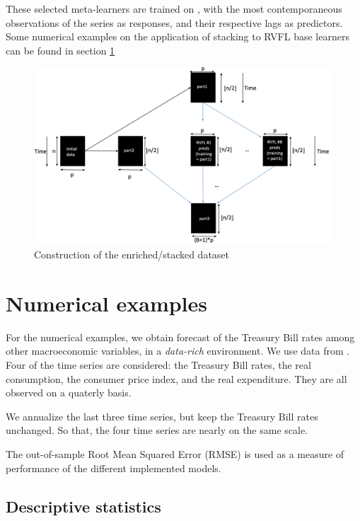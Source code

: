 These selected meta-learners are trained on , with the most contemporaneous observations of the series as responses, and their respective lags as predictors. Some numerical examples on the application of stacking to RVFL base learners can be found in section \ref{sec:numericalexamples}

\begin{figure}[!htb]
\centering
\includegraphics[width=13cm]{gfx/chapter-rvfl-ensembles/rvfl_stacking.png}
\caption{Construction of the enriched/stacked dataset}
\label{rvfl_stacking_plot}
\end{figure}


\section{Numerical examples}
\label{sec:numericalexamples}

For the numerical examples, we obtain forecast of the Treasury Bill rates among other macroeconomic variables, in a \textit{data-rich} environment. We use data from \cite{greene2000econometric}. Four of the time series are considered: the Treasury Bill rates, the real consumption, the consumer price index, and the real expenditure. They are all observed on a quaterly basis.

We annualize the last three time series, but keep the Treasury Bill rates unchanged. So that, the four time series are nearly on the same scale.

The out-of-sample Root Mean Squared Error (RMSE) is used as a measure of performance of the different implemented models.

\subsection{Descriptive statistics}

